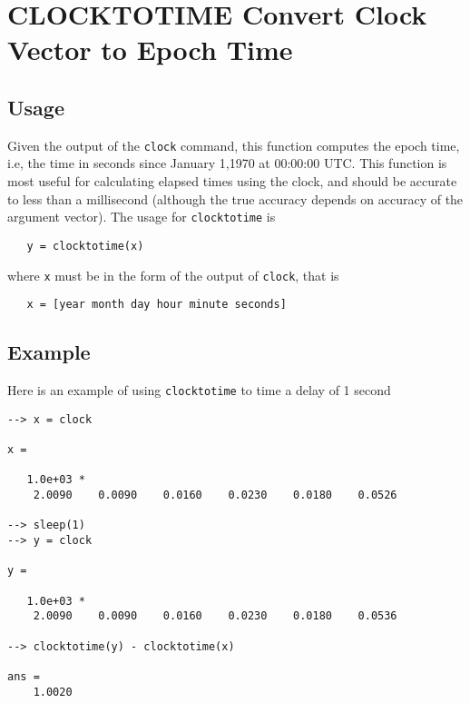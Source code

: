 \section{CLOCKTOTIME Convert Clock Vector to Epoch Time}

\subsection{Usage}

Given the output of the \verb|clock| command, this function computes
the epoch time, i.e, the time in seconds since January 1,1970 
at 00:00:00 UTC.  This function is most useful for calculating elapsed
times using the clock, and should be accurate to less than a millisecond
(although the true accuracy depends on accuracy of the argument vector). 
The usage for \verb|clocktotime| is
\begin{verbatim}
   y = clocktotime(x)
\end{verbatim}
where \verb|x| must be in the form of the output of \verb|clock|, that is
\begin{verbatim}
   x = [year month day hour minute seconds]
\end{verbatim}
\subsection{Example}

Here is an example of using \verb|clocktotime| to time a delay of 1 second
\begin{verbatim}
--> x = clock

x = 

   1.0e+03 * 
    2.0090    0.0090    0.0160    0.0230    0.0180    0.0526 

--> sleep(1)
--> y = clock

y = 

   1.0e+03 * 
    2.0090    0.0090    0.0160    0.0230    0.0180    0.0536 

--> clocktotime(y) - clocktotime(x)

ans = 
    1.0020 
\end{verbatim}
